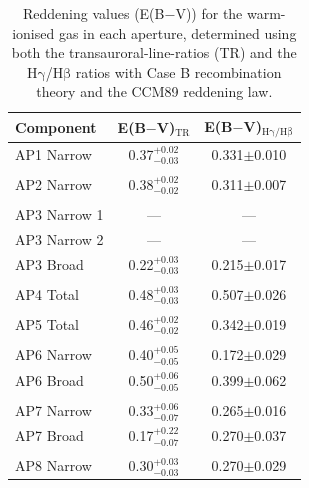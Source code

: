 \begin{table}[]
    \centering
	\def\arraystretch{1.5}
	\begin{tabular}{lcc}
	Component        &  E(B$-$V)$_\mathrm{TR}$      & E(B$-$V)$_{\mathrm{H\gamma}/\mathrm{H\beta}}$ \\ \hline
	AP1 Narrow       & 0.37$^{+0.02}_{-0.03}$ & 0.331$\pm$0.010   \\
	   &	&	\\
	AP2 Narrow       & 0.38$^{+0.02}_{-0.02}$ & 0.311$\pm$0.007   \\
	   &	&	\\
	AP3 Narrow 1     & --- & ---                   \\
	AP3 Narrow 2     & --- & ---                  \\
	AP3 Broad        & 0.22$^{+0.03}_{-0.03}$ & 0.215$\pm$0.017   \\
	   &	&	\\
	AP4 Total        & 0.48$^{+0.03}_{-0.03}$ & 0.507$\pm$0.026   \\
	   &	&	\\
	AP5 Total        & 0.46$^{+0.02}_{-0.02}$ & 0.342$\pm$0.019   \\
	   &	&	\\
	AP6 Narrow       & 0.40$^{+0.05}_{-0.05}$ & 0.172$\pm$0.029   \\
	AP6 Broad        & 0.50$^{+0.06}_{-0.05}$ & 0.399$\pm$0.062   \\
	   &	&	\\
	AP7 Narrow       & 0.33$^{+0.06}_{-0.07}$ & 0.265$\pm$0.016   \\
	AP7 Broad        & 0.17$^{+0.22}_{-0.07}$ & 0.270$\pm$0.037   \\ 
	   &	&	\\
	AP8 Narrow       & 0.30$^{+0.03}_{-0.03}$ & 0.270$\pm$0.029   \\
	\end{tabular}
    \caption[E(B$-$V) values for the warm-ionised gas along the radio axis of IC, measured with the transauroral line technique and the Balmer decrement method.]{Reddening values (E(B$-$V)) for the warm-ionised gas in each aperture, determined using both the transauroral-line-ratios (TR) and the H$\mathrm{\gamma}$/H$\mathrm{\beta}$ ratios with Case B recombination theory and the CCM89 reddening law.}
    \label{tab: xshooter_ic5063: reddenings}
\end{table}

